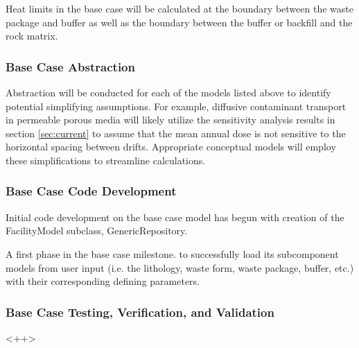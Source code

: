 
      Heat limits in the base case will be calculated at the boundary between 
      the waste package and buffer as well as the boundary between the buffer or  
      backfill and the rock matrix.

\subsubsection{Base Case Abstraction }


  Abstraction will be conducted for each of the models listed above to identify  
  potential simplifying assumptions. For example, diffusive contaminant 
  transport in  permeable porous media will likely utilize the sensitivity 
  analysis results in section \ref{sec:current} to assume that the mean annual 
  dose is not sensitive to the horizontal spacing between drifts. Appropriate 
  conceptual models will employ these simplifications to streamline 
  calculations. 

\subsubsection{Base Case Code Development}

  
  Initial code development on the base case model has begun with creation of the 
  FacilityModel subclass, GenericRepository. 

  A first phase in the base case milestone. 
  to successfully load its subcomponent models from user input (i.e.
  the lithology, waste form, waste package, buffer, etc.) with their 
  corresponding defining parameters. 
  





\subsubsection{Base Case Testing, Verification, and Validation}<++>





